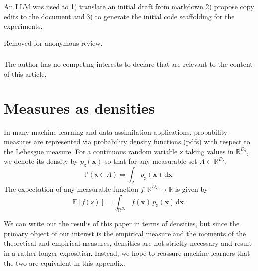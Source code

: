 \documentclass[runningheads]{llncs}
\newcommand{\Ex}{\mathbb{E}}
\newcommand{\vv}[1]{\boldsymbol{#1}}
\newcommand{\rv}[1]{\mathsf{#1}}
\newcommand{\vrv}[1]{\vv{\rv{#1}}}
\renewcommand{\Pr}{\mathbb{P}}
\begin{document}
\begin{credits}

\subsubsection{\ackname}

An LLM was used to 1) translate an initial draft from markdown 2) propose copy edits to the document and 3) to generate the initial code scaffolding for the experiments.

Removed for anonymous review.

\subsubsection{\discintname}
The author has no competing interests to declare that are
relevant to the content of this article.
\end{credits}




\appendix

\section{Measures as densities}\label{sec:densities-please}

In many machine learning and data assimilation applications, probability measures are represented via probability density functions (pdfs) with respect to the Lebesgue measure. For a continuous random variable \(\vrv{x}\) taking values in \(\mathbb{R}^{D_{\vrv{x}}}\), we denote its density by \(p_{\vrv{x}}(\vv{x})\) so that for any measurable set \(A \subset \mathbb{R}^{D_{\vrv{x}}}\),
\begin{equation}
    \Pr\left(\vrv{x} \in A\right)
    = \int_A p_{\vrv{x}}(\vv{x})\,\mathrm{d}\vv{x}.
\end{equation}
The expectation of any measurable function \(f:\mathbb{R}^{D_{\vrv{x}}}\to\mathbb{R}\) is given by
\begin{equation}
    \Ex[f(\vrv{x})] = \int_{\mathbb{R}^{D_{\vrv{x}}}} f(\vv{x})\,p_{\vrv{x}}(\vv{x})\,\mathrm{d}\vv{x}.
\end{equation}

We can write out the results of this paper in terms of densities, but since the primary object of our interest is the empirical measure and the moments of the theoretical and empirical measures, densities are not strictly necessary and result in a rather longer exposition.
Instead, we hope to reassure machine-learners that the two are equivalent in this appendix.
\end{document}
